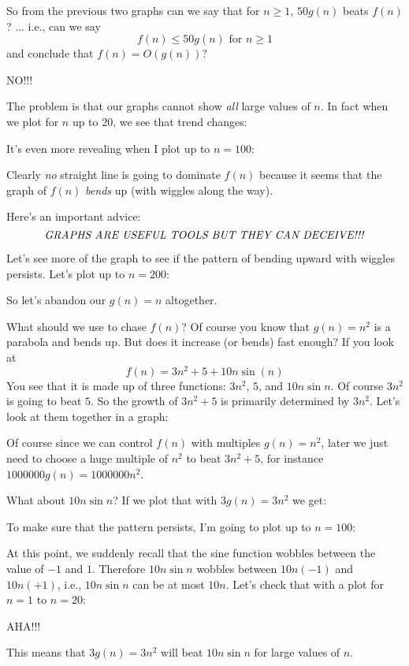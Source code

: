 So from the previous two graphs
can we say that for $n \geq 1$, $50g(n)$ beats $f(n)$? ... i.e.,
can we say
\[
f(n) \leq 50 g(n) \text{ for $n \geq 1$}
\]
and conclude that $f(n) = O(g(n))$?

NO!!!

The problem is that our graphs cannot show \textit{all}
large values of $n$.
In fact when we plot for $n$ up to 20, we see that trend changes:


It's even more revealing when I plot up to $n = 100$:


Clearly \textit{no} straight line is going to dominate $f(n)$ because
it seems that the graph of $f(n)$ \textit{bends} up (with wiggles along the way).

Here's an important advice:
\[
\text{\textit{GRAPHS ARE USEFUL TOOLS BUT THEY CAN DECEIVE!!!}}
\]

Let's see more of the graph to see if the pattern of bending
upward with wiggles persists.
Let's plot up to $n = 200$:


So let's abandon our $g(n) = n$ altogether.

What should we use to chase $f(n)$?
Of course you know that $g(n) = n^2$ is a parabola and bends up.
But does it increase (or bends) fast enough?
If you look at 
\[
f(n) = 3n^2 + 5 + 10 n \sin (n)
\]
You see that it is made up of three functions:
$3n^2$, $5$, and $10n \sin n$.
Of course $3n^2$ is going to beat $5$.
So the growth of $3n^2 + 5$ is primarily determined by $3n^2$.
Let's look at them together in a graph:

Of course since we can control $f(n)$ with multiples $g(n) = n^2$,
later we just need to choose a huge multiple of $n^2$ to 
beat $3n^2 + 5$, for instance $1000000 g(n) = 1000000 n^2$.

What about $10n \sin n$?
If we plot that with $3g(n) = 3n^2$ we get:

To make sure that the pattern persists, I'm going to plot up
to $n = 100$:


At this point, we suddenly recall that the sine function
wobbles between the value of $-1$ and $1$.
Therefore $10n \sin n$ wobbles between $10n (-1)$ and $10n (+1)$,
i.e., $10n \sin n$ can be at most $10n$.
Let's check that with a plot for $n = 1$ to $n = 20$:


AHA!!!

This means that $3g(n) = 3n^2$ will beat $10n \sin n$ for large values of $n$.

